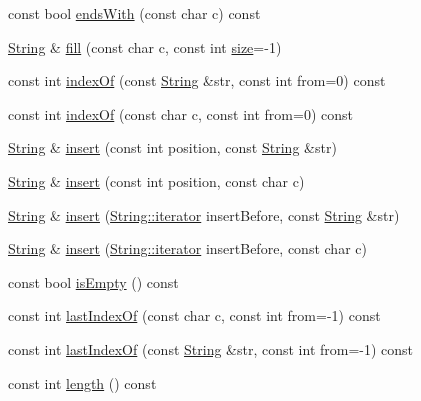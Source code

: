 \begin{DoxyCompactItemize}
\item 
const bool \hyperlink{classprism_1_1_string_aa478bddcdb9ea30ba0a8d1389296607c}{ends\+With} (const char c) const 
\item 
\hyperlink{classprism_1_1_string}{String} \& \hyperlink{classprism_1_1_string_ae7d89942e4c7ab431331400eb5489854}{fill} (const char c, const int \hyperlink{classprism_1_1_string_a603b5a90681d43adf7c6c29018e0300c}{size}=-\/1)
\item 
const int \hyperlink{classprism_1_1_string_a76178d2dde63c7b76512df05ef093fac}{index\+Of} (const \hyperlink{classprism_1_1_string}{String} \&str, const int from=0) const 
\item 
const int \hyperlink{classprism_1_1_string_aa72e151f93550f307af8fc0f4e56ea72}{index\+Of} (const char c, const int from=0) const 
\item 
\hyperlink{classprism_1_1_string}{String} \& \hyperlink{classprism_1_1_string_aebf2f6e19cb77967798ba096bb559f81}{insert} (const int position, const \hyperlink{classprism_1_1_string}{String} \&str)
\item 
\hyperlink{classprism_1_1_string}{String} \& \hyperlink{classprism_1_1_string_a370a65ea4c44d5f2e3d85f441f708c3f}{insert} (const int position, const char c)
\item 
\hyperlink{classprism_1_1_string}{String} \& \hyperlink{classprism_1_1_string_ae21a3ae6bcf4bd889a4994fead75188c}{insert} (\hyperlink{classprism_1_1_string_adacc7975837e5fff95d70690777fb330}{String\+::iterator} insert\+Before, const \hyperlink{classprism_1_1_string}{String} \&str)
\item 
\hyperlink{classprism_1_1_string}{String} \& \hyperlink{classprism_1_1_string_ac9d7c3aa36ad7a33ba9f13a00456beec}{insert} (\hyperlink{classprism_1_1_string_adacc7975837e5fff95d70690777fb330}{String\+::iterator} insert\+Before, const char c)
\item 
const bool \hyperlink{classprism_1_1_string_a2f2960f59d644b2d0f390a090fa7a4ef}{is\+Empty} () const 
\item 
const int \hyperlink{classprism_1_1_string_a94a9059dc86dcfcbf409ffc83f3da2a8}{last\+Index\+Of} (const char c, const int from=-\/1) const 
\item 
const int \hyperlink{classprism_1_1_string_a0e3385b701880ee0305dcd9e12b33366}{last\+Index\+Of} (const \hyperlink{classprism_1_1_string}{String} \&str, const int from=-\/1) const 
\item 
const int \hyperlink{classprism_1_1_string_a7dfc72427863cefb9fe883599272ca7d}{length} () const 
\item 

\end{DoxyCompactItemize}
